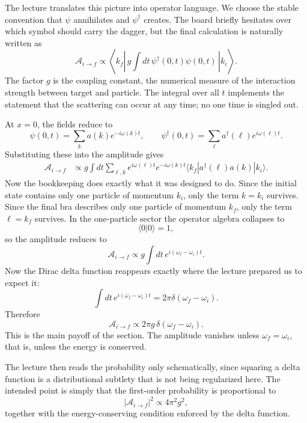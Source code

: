 The lecture translates this picture into operator language. We choose the stable convention that \(\psi\) annihilates and \(\psi^\dagger\) creates. The board briefly hesitates over which symbol should carry the dagger, but the final calculation is naturally written as
\begin{equation}
\mathcal A_{i\to f}\propto \left\langle k_f\left|\,g\int dt\,\psi^\dagger(0,t)\psi(0,t)\,\right|k_i\right\rangle.
\end{equation}
The factor \(g\) is the coupling constant, the numerical measure of the interaction strength between target and particle. The integral over all \(t\) implements the statement that the scattering can occur at any time; no one time is singled out.

At \(x=0\), the fields reduce to
\begin{equation}
\psi(0,t)=\sum_k a(k)e^{-i\omega(k)t},
\qquad
\psi^\dagger(0,t)=\sum_\ell a^\dagger(\ell)e^{i\omega(\ell)t}.
\end{equation}
Substituting these into the amplitude gives
\begin{align}
\mathcal A_{i\to f}
&\propto
g\int dt
\sum_{\ell,k}
e^{i\omega(\ell)t}e^{-i\omega(k)t}
\langle k_f|a^\dagger(\ell)a(k)|k_i\rangle.
\end{align}
Now the bookkeeping does exactly what it was designed to do. Since the initial state contains only one particle of momentum \(k_i\), only the term \(k=k_i\) survives. Since the final bra describes only one particle of momentum \(k_f\), only the term \(\ell=k_f\) survives. In the one-particle sector the operator algebra collapses to
\[
\langle 0|0\rangle=1,
\]
so the amplitude reduces to
\begin{equation}
\mathcal A_{i\to f}\propto g\int dt\,e^{i(\omega_f-\omega_i)t}.
\end{equation}
Now the Dirac delta function reappears exactly where the lecture prepared us to expect it:
\begin{equation}
\int dt\,e^{i(\omega_f-\omega_i)t}=2\pi\delta(\omega_f-\omega_i).
\end{equation}
Therefore
\begin{equation}
\mathcal A_{i\to f}\propto 2\pi g\,\delta(\omega_f-\omega_i).
\end{equation}
This is the main payoff of the section. The amplitude vanishes unless \(\omega_f=\omega_i\), that is, unless the energy is conserved.

The lecture then reads the probability only schematically, since squaring a delta function is a distributional subtlety that is not being regularized here. The intended point is simply that the first-order probability is proportional to
\begin{equation}
|\mathcal A_{i\to f}|^2\propto 4\pi^2 g^2,
\end{equation}
together with the energy-conserving condition enforced by the delta function.

